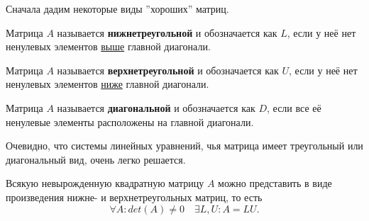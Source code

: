 \documentclass{article}
\begin{document}
Сначала дадим некоторые виды ''хороших'' матриц.

\begin{define}
	Матрица $A$ называется \textbf{нижнетреугольной} и обозначается как $L$,
	если у неё нет ненулевых элементов \underline{выше} главной диагонали.
\end{define}

\begin{define}
	Матрица $A$ называется \textbf{верхнетреугольной} и обозначается как
	$U$, если у неё нет ненулевых элементов \underline{ниже} главной
	диагонали.
\end{define}

\begin{define}
	Матрица $A$ называется \textbf{диагональной} и обозначается как $D$,
	если все её ненулевые элементы расположены на главной диагонали.
\end{define}

Очевидно, что системы линейных уравнений, чья матрица имеет треугольный
или диагональный вид, очень легко решается.

\begin{theorem}[об LU-разложении]
	Всякую невырожденную квадратную матрицу $A$ можно представить в виде
	произведения нижне- и верхнетреугольных матриц, то есть
	\[\forall A: det(A)\ne 0\quad\exists L,U: A=LU.\]
\end{theorem}
\end{document}
